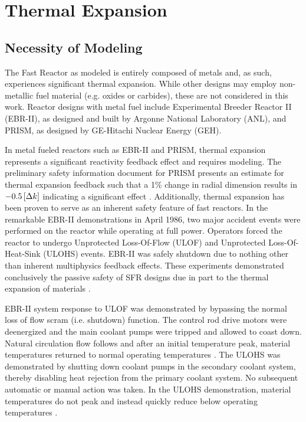 \chapter{Thermal Expansion}
\label{ch:thermalExpansion}

\section{Necessity of Modeling}
  The Fast Reactor as modeled is entirely composed of
  metals and, as such, experiences significant thermal expansion. While other 
  designs may employ non-metallic fuel material (e.g. oxides or carbides), these 
  are not considered in this work. Reactor designs with metal fuel include 
  Experimental Breeder Reactor II (EBR-II), as designed and built by Argonne 
  National Laboratory (ANL), and PRISM, as designed by GE-Hitachi Nuclear Energy 
  (GEH).

  In metal fueled reactors such as EBR-II and PRISM, thermal expansion 
  represents a significant reactivity feedback effect and requires modeling. 
  The preliminary safety information document for PRISM presents an 
  estimate for thermal expansion feedback such that a 1\% change in radial 
  dimension results in $-0.5 \left[\text{{$\Delta k$}}\right]$ indicating a significant effect 
  \cite{GEFR793}. Additionally, thermal expansion has been proven to serve as an 
  inherent safety feature of fast reactors. In the remarkable EBR-II 
  demonstrations in April 1986, two major accident events were performed on the 
  reactor while operating at full power. Operators forced the reactor to undergo 
  Unprotected Loss-Of-Flow (ULOF) and Unprotected Loss-Of-Heat-Sink (ULOHS) 
  events. EBR-II was safely shutdown due to nothing other than inherent
  multiphysics feedback effects. These experiments demonstrated conclusively the 
  passive safety of SFR designs due in part to the thermal expansion of 
  materials \cite{PlentifulEnergy}.

  EBR-II system response to ULOF was demonstrated by bypassing the normal loss 
  of flow scram (i.e. shutdown) function. The control rod drive motors were 
  deenergized and the main coolant pumps were tripped and allowed to coast down. 
  Natural circulation flow follows and after an initial temperature peak, 
  material temperatures returned to normal operating temperatures 
  \cite{ebriitests}. The ULOHS was demonstrated by shutting down coolant pumps 
  in the secondary coolant system, thereby disabling heat rejection from the 
  primary coolant system. No subsequent automatic or manual action was taken. In 
  the ULOHS demonstration, material temperatures do not peak and instead quickly 
  reduce below operating temperatures \cite{ebriitests}.


